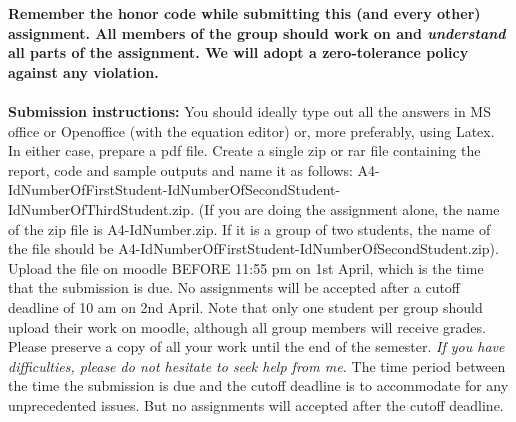 \documentclass[11pt]{article}
\begin{document}
\maketitle

\textbf{Remember the honor code while submitting this (and every other) assignment. All members of the group should work on and \emph{understand} all parts of the assignment. We will adopt a \textbf{zero-tolerance policy} against any violation.}
\\
\\
\textbf{Submission instructions:} You should ideally type out all the answers in MS office or Openoffice (with the equation editor) or, more preferably, using Latex. In either case, prepare a pdf file. Create a single zip or rar file containing the report, code and sample outputs and name it as follows: A4-IdNumberOfFirstStudent-IdNumberOfSecondStudent-IdNumberOfThirdStudent.zip. (If you are doing the assignment alone, the name of the zip file is A4-IdNumber.zip. If it is a group of two students, the name of the file should be  A4-IdNumberOfFirstStudent-IdNumberOfSecondStudent.zip). Upload the file on moodle BEFORE 11:55 pm on 1st April, which is the time that the submission is due. No assignments will be accepted after a cutoff deadline of 10 am on 2nd April. Note that only one student per group should upload their work on moodle, although all group members will receive grades. Please preserve a copy of all your work until the end of the semester. \emph{If you have difficulties, please do not hesitate to seek help from me.} The time period between the time the submission is due and the cutoff deadline is to accommodate for any unprecedented issues. But no assignments will accepted after the cutoff deadline. 
\end{document}
